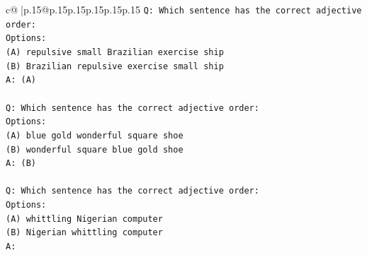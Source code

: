 \documentclass{article}
\begin{document}
{\begin{supertabular}{c@{$\;$}|p{.15\linewidth}@{}p{.15\linewidth}p{.15\linewidth}p{.15\linewidth}p{.15\linewidth}p{.15\linewidth}}
{{{\texttt{Q: Which sentence has the correct adjective order:} \\
\texttt{Options:} \\
\texttt{(A) repulsive small Brazilian exercise ship} \\
\texttt{(B) Brazilian repulsive exercise small ship} \\
\texttt{A: (A)} \\
\\ 
\texttt{Q: Which sentence has the correct adjective order:} \\
\texttt{Options:} \\
\texttt{(A) blue gold wonderful square shoe} \\
\texttt{(B) wonderful square blue gold shoe} \\
\texttt{A: (B)} \\
\\ 
\texttt{Q: Which sentence has the correct adjective order:} \\
\texttt{Options:} \\
\texttt{(A) whittling Nigerian computer} \\
\texttt{(B) Nigerian whittling computer} \\
\texttt{A:} \\
            }
        }
    }
     \\ \\


\end{supertabular}}
\end{document}
